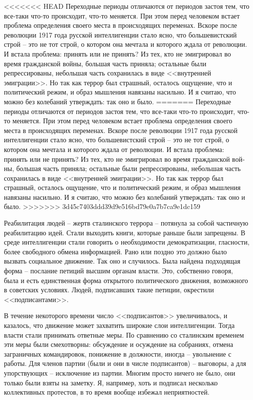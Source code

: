 \documentclass{book}
\begin{document}
<<<<<<< HEAD
Переходные периоды отличаются от периодов застоя тем, что все‑таки что‑то происходит, что‑то меняется. При этом перед человеком встает проблема определения своего места в происходящих переменах. Вскоре после революции 1917 го­да русской интеллигенции стало ясно, что большевистский строй -- это не тот строй, о котором она мечтала и которого ждала от революции. И встала проблема: принять или не при­нять? Из тех, кто не эмигрировал во время гражданской вой­ны, большая часть приняла; остальные были репрессированы, небольшая часть сохранилась в виде <<внутренней эмиграции>>. Но так как террор был страшный, осталось ощущение, что и политический режим, и образ мышления навязаны насильно. И я считаю, что можно без колебаний утверждать: так оно и было.
=======
Переходные периоды отличаются от периодов застоя тем, что все-таки что-то происходит, что-то меняется. При этом перед человеком встает проблема определения своего места в происходящих переменах. Вскоре после революции 1917 го­да русской интеллигенции стало ясно, что большевистский строй -- это не тот строй, о котором она мечтала и которого ждала от революции. И встала проблема: принять или не при­нять? Из тех, кто не эмигрировал во время гражданской вой­ны, большая часть приняла; остальные были репрессированы, небольшая часть сохранилась в виде <<внутренней эмиграции>>. Но так как террор был страшный, осталось ощущение, что и политический режим, и образ мышления навязаны насильно. И я считаю, что можно без колебаний утверждать: так оно и было.
>>>>>>> 3d45c7403ddd39d9e516bd79e0a7b7ca9e1dc159

Реабилитация людей -- жертв сталинского террора -- потя­нула за собой частичную реабилитацию идей. Стали выходить книги, которые раньше были запрещены. В среде интеллиген­ции стали говорить о необходимости демократизации, глас­ности, более свободного обмена информацией. Рано или позд­но это должно было вызвать социальное движение. Так оно и случилось. Была найдена подходящая форма -- послание петиций высшим органам власти. Это, собственно говоря, была и есть единственная форма открытого политического движения, возможного в советских условиях. Людей, подписавших такие петиции, окрестили <<подписантами>>.

В течение некоторого времени число <<подписантов>> увели­чивалось, и казалось, что движение может захватить широкие слои интеллигенции. Тогда власти стали принимать ответные меры. По сравнению со сталинским временем эти меры были смехотворны: обсуждение и осуждение на собраниях, отмена заграничных командировок, понижение в должности, иногда -- увольнение с работы. Для членов партии (были и они в числе подписантов) -- выговоры, а для упорствующих -- исключение из партии. Многим просто ничего не было, они только были взяты на заметку. Я, например, хоть и подписал несколько коллективных протестов, в то время вообще избежал непри­ятностей.
\end{document}
